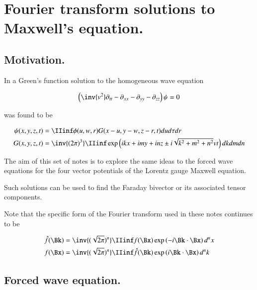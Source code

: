 \chapter{Fourier transform solutions to Maxwell's equation.}\label{chap:PJfourierMaxwellSecondOrder}
\date{ Jan 29, 2009.  $RCSfile: fourierMaxwell.tex,v $ Last $Revision: 1.22 $ $Date: 2009/10/22 02:07:20 $ }

\section{Motivation. }

In  a Green's function solution to the homogeneous
wave equation

\begin{align}\label{eqn:fourier_maxwell:wave}
\left(\inv{v^2} \partial_{tt} -\partial_{xx} -\partial_{yy} -\partial_{zz} \right)\psi = 0
\end{align}

was found to be

\begin{align}\label{eqn:fourier_maxwell:greensSolution3d}
{\psi}(x,y,z,t) &= \IIinf \phi(u,w,r) G( x-u, y-w, z-r, t) du d\tau dr \\
G(x,y,z,t) &= \inv{({2\pi})^3} \IIinf \exp\left( i k x + i m y + i n z \pm i \sqrt{k^2 + m^2 + n^2} v t \right) dk dm dn
\end{align}

The aim of this set of notes is to explore the same ideas to the forced wave
equations for the four vector potentials of the Lorentz gauge Maxwell equation.

Such solutions can be used to find the Faraday bivector or its associated
tensor components.

Note that the specific form of the Fourier transform used in these notes continues to be

\begin{align}
\hat{f}(\Bk) &= \inv{(\sqrt{2\pi})^n} \IIinf f(\Bx) \exp\left( -i \Bk \cdot \Bx \right) d^n x \\
{f}(\Bx) &= \inv{(\sqrt{2\pi})^n} \IIinf \hat{f}(\Bk) \exp\left( i \Bk \cdot \Bx \right) d^n k
\end{align}

\section{Forced wave equation. }

